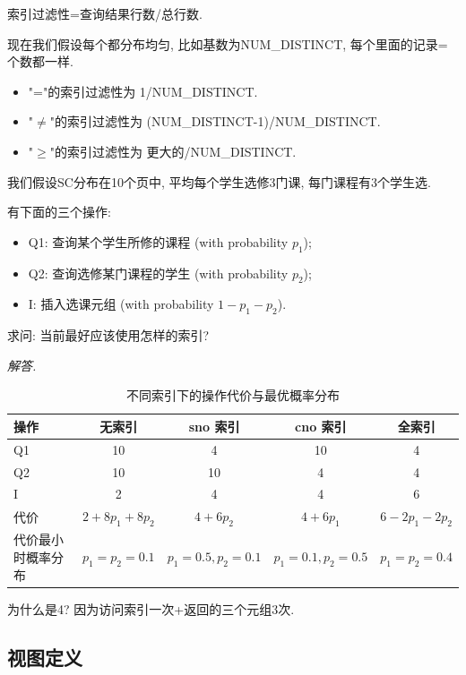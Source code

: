\begin{definition}[索引过滤性]
  索引过滤性=查询结果行数/总行数.

  现在我们假设每个都分布均匀, 比如基数为NUM\_DISTINCT, 每个里面的记录=个数都一样.
  \begin{itemize}
    \item "="的索引过滤性为 1/NUM\_DISTINCT.
    \item "$\neq$"的索引过滤性为 (NUM\_DISTINCT-1)/NUM\_DISTINCT.
    \item "$\geq$"的索引过滤性为 更大的/NUM\_DISTINCT.
  \end{itemize}
\end{definition}

\begin{example}
  我们假设SC分布在10个页中, 平均每个学生选修3门课, 每门课程有3个学生选.

  有下面的三个操作:
  \begin{itemize}
    \item Q1: 查询某个学生所修的课程 (with probability $p_1$);
    \item Q2: 查询选修某门课程的学生 (with probability $p_2$);
    \item I: 插入选课元组 (with probability $1-p_1-p_2$).
  \end{itemize}
  求问: 当前最好应该使用怎样的索引?
\end{example}

\textit{ 解答. }
\begin{table}[ht]
\centering
\begin{tabular}{lcccc}
\hline
操作 & 无索引 & sno 索引 & cno 索引 & 全索引 \\
\hline
Q1 & 10 & 4 & 10 & 4 \\
Q2 & 10 & 10 & 4 & 4 \\
I & 2 & 4 & 4 & 6 \\
\hline
代价 & $2 + 8p_1 + 8p_2$ & $4 + 6p_2$ & $4 + 6p_1$ & $6 - 2p_1 - 2p_2$ \\
代价最小时概率分布 & $p_1 = p_2 = 0.1$ & $p_1 = 0.5, p_2 = 0.1$ & $p_1 = 0.1, p_2 = 0.5$ & $p_1 = p_2 = 0.4$ \\
\hline
\end{tabular}
\caption{不同索引下的操作代价与最优概率分布}
\end{table}

为什么是4? 因为访问索引一次+返回的三个元组3次.

\subsection{视图定义}

